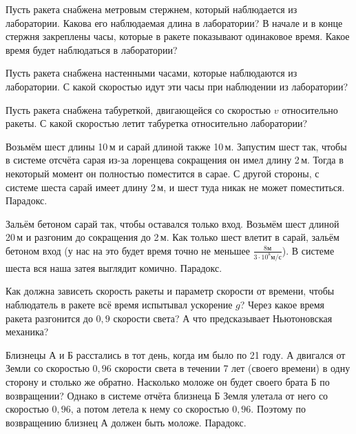 \documentclass[a4paper,12pt]{article}
\newcommand{\мв}{\,м$_в$}
\begin{document}



Пусть ракета снабжена метровым стержнем, который наблюдается из лаборатории.
Какова его наблюдаемая длина в лаборатории?
В начале и в конце стержня закреплены часы, которые в ракете показывают одинаковое время.
Какое время будет наблюдаться в лаборатории?

Пусть ракета снабжена настенными часами, которые наблюдаются из лаборатории.
С какой скоростью идут эти часы при наблюдении из лаборатории?

Пусть ракета снабжена табуреткой, двигающейся со скоростью $v$ относительно ракеты.
С какой скоростью летит табуретка относительно лаборатории?

Возьмём шест длины 10\,м и сарай длиной также 10\,м.
Запустим шест так, чтобы в системе отсчёта сарая из-за лоренцева сокращения он имел длину 2\,м.
Тогда в некоторый момент он полностью поместится в сарае.
С другой стороны, с системе шеста сарай имеет длину 2\,м, и шест туда никак не может поместиться. Парадокс.


Зальём бетоном сарай так, чтобы оставался только вход.
Возьмём шест длиной 20\,м и разгоним до сокращения до 2\,м.
Как только шест влетит в сарай, зальём бетоном вход (у нас на это будет время точно не меньшее $\frac{8м}{3\cdot10^8 м/с}$).
В системе шеста вся наша затея выглядит комично. Парадокс.



Как должна зависеть скорость ракеты и параметр скорости от времени, чтобы наблюдатель в ракете всё время испытывал ускорение $g$?
Через какое время ракета разгонится до $0{,}9$ скорости света? А что предсказывает Ньютоновская механика?

Близнецы А и Б расстались в тот день, когда им было по 21 году.
А двигался от Земли со скоростью $0{,}96$ скорости света в течении 7 лет (своего времени) в одну сторону и столько же обратно.
Насколько моложе он будет своего брата Б по возвращении?
Однако в системе отчёта близнеца Б Земля улетала от него со скоростью $0{,}96$,
а потом летела к нему со скоростью $0{,}96$.
Поэтому по возвращению близнец А должен быть моложе.
Парадокс.
\end{document}
